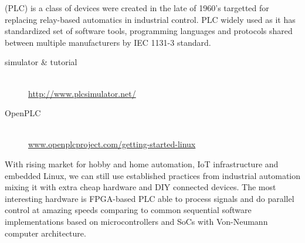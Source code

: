 \clearpage
{}\secdown

 (PLC) is a class of devices were created in
the late of 1960's targetted for replacing relay-based automatics in industrial
control. PLC widely used as it has standardized set of software tools,
programming languages and protocols shared between multiple manufacturers by IEC
1131-3 standard.

\begin{description}
\item[simulator \& tutorial]\ \\
\url{http://www.plcsimulator.net/}
\item[OpenPLC]\ \\
\url{www.openplcproject.com/getting-started-linux}
\end{description}

\pg With rising market for hobby and home automation, IoT infrastructure and
embedded Linux, we can still use established practices from industrial
automation mixing it with extra cheap hardware and DIY connected devices. The
most interesting hardware is FPGA-based PLC able to process signals and do
parallel control at amazing speeds comparing to common sequential software
implementations based on microcontrollers and SoCs with Von-Neumann computer
architecture.

\secup
